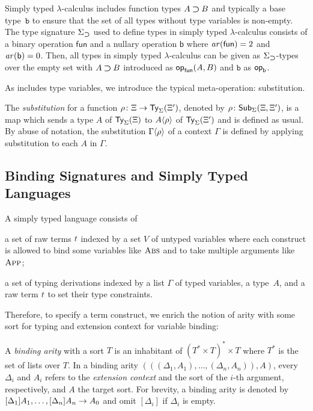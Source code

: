 \begin{example} \label{ex:type-signature-for-function-type}
  Simply typed $\lambda$-calculus includes function types $A \mathbin{\bm{\supset}} B$ and typically a base type~$\mathtt{b}$ to ensure that the set of all types without type variables is non-empty.
  The type signature $\Sigma_{\mathbin{\bm{\supset}}}$ used to define types in simply typed $\lambda$-calculus consists of a binary operation $\mathsf{fun}$ and a nullary operation $\mathsf{b}$ where $\mathit{ar}(\mathsf{fun}) = 2$ and $\mathit{ar}(\mathsf{b}) = 0$.
  Then, all types in simply typed $\lambda$-calculus can be given as $\Sigma_{\mathbin{\bm{\supset}}}$-types over the empty set with $A \mathbin{\bm{\supset}} B$ introduced as $\mathsf{op}_{\mathsf{fun}}(A, B)$ and $\mathtt{b}$ as $\mathsf{op}_{\mathsf{b}}$. 
\end{example}

As  includes type variables, we introduce the typical meta-operation: substitution.
\begin{definition}
  The \emph{substitution} for a function $\rho\colon \Xi \to \mathsf{Ty}_{\Sigma}(\Xi')$, denoted by $\rho\colon \mathsf{Sub}_{\Sigma}(\Xi,\Xi')$, is a map which sends a type $A$ of $\mathsf{Ty}_{\Sigma}(\Xi)$ to ${A}\!\left<{\rho}\right>$ of $\mathsf{Ty}_{\Sigma}(\Xi')$ and is defined as usual.
  By abuse of notation, the substitution ${\Gamma}\!\left<{\rho}\right>$ of a context $\Gamma$ is defined by applying substitution to each $A$ in $\Gamma$.
\end{definition}

\subsection{Binding Signatures and Simply Typed Languages} \label{subsec:binding-sig}

A simply typed language consists of
\begin{enumerate*}
  \item a set of raw terms $\isTerm{t}$ indexed by a set $V$ of untyped variables where each construct is allowed to bind some variables like $\textnormal{\textsc{Abs}}$ and to take multiple arguments like $\textnormal{\textsc{App}}$;
  \item a set of typing derivations indexed by a list $\Gamma$ of typed variables, a type~$A$, and a raw term $\isTerm{t}$ to set their type constraints. 
\end{enumerate*}
Therefore, to specify a term construct, we enrich the notion of arity with some sort for typing and extension context for variable binding:
\begin{definition}\label{def:binding-arity}
  A \emph{binding arity} with a sort $T$ is an inhabitant of $\left(T^* \times T\right)^* \times T$ where $T^*$ is the set of lists over $T$.
  In a binding arity $(((\Delta_1, A_1), \ldots, (\Delta_n, A_n)), A)$, every $\Delta_i$ and $A_i$ refers to the \emph{extension context} and the sort of the $i$-th argument, respectively, and $A$ the target sort.
  For brevity, a binding arity is denoted by $[\Delta_{1}]A_{1}, \ldots, [\Delta_{n}]A_{n} \to {A_0}$ and omit $[\Delta_i]$ if $\Delta_i$ is empty.
\end{definition}

